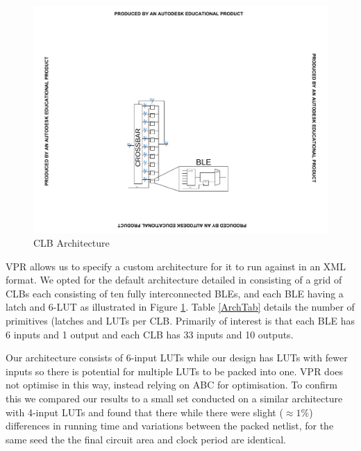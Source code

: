 \documentclass[12pt,final,oneside,a4paper]{dwThesis} %
\begin{document}
   \begin{figure}

      \begin{center}

         \includegraphics[clip,trim=8cm 4cm 8cm 8cm]{images/CLB.pdf}
         \caption{\gls{CLB} Architecture} \label{ArchFig} 
      \end{center}


   \end{figure}
   \gls{VPR} allows us to specify a custom architecture for it to
   run against in an XML format. We opted for the default architecture detailed
   in \cite{VPRManual} consisting of a grid of \glspl{CLB} each consisting of
   ten fully interconnected \glspl{BLE}, and each \gls{BLE} having a latch and
   6-\gls{LUT} as illustrated in Figure \ref{ArchFig}.  Table \ref{ArchTab}
   details the number of primitives (latches and \glspl{LUT} per \gls{CLB}.
   Primarily of interest is that each \gls{BLE} has 6 inputs and 1 output and
   each \gls{CLB} has 33 inputs and 10 outputs.
   
   Our architecture consists of 6-input \glspl{LUT} while our design has \glspl{LUT} with fewer inputs so there is potential for multiple \glspl{LUT} to be packed into one.
   \gls{VPR} does not optimise in this way, instead relying on \gls{ABC} for optimisation.
   To confirm this we compared our results to a small set conducted on a similar architecture with 4-input \glspl{LUT} and found that there while there were slight ($\approx1\%$) differences in running time and variations between the packed netlist, for the same seed the the final circuit area and clock period are identical.
\end{document}
